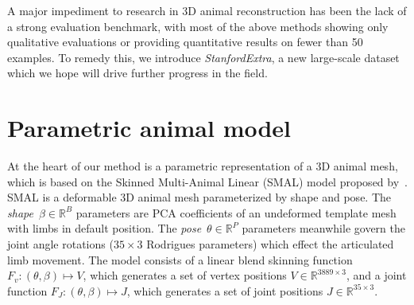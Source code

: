 
A major impediment to research in 3D animal reconstruction has been the lack of a strong evaluation benchmark, with most of the above methods showing only qualitative evaluations or providing quantitative results on fewer than 50 examples. To remedy this, we introduce \emph{StanfordExtra}, a new large-scale dataset which we hope will drive further progress in the field. 



\section{Parametric animal model}

\def\R#1{{\mathbb{R}^{#1}}}
\def\RR#1#2{{\mathbb{R}^{#1 \times #2}}}
\def\posn{\phi}
\def\pose{\theta}
\def\npose{P}
\def\shape{\beta}
\def\scale{\kappa}
\def\trans{t}
\def\betacov{{\Sigma_{\beta}}}
\def\posecov{{\Sigma_{\pose}}}
\def\posemean{{\mu_{\pose}}}
\def\betamean{{\mu_{\beta}}}
\def\nimages{N}
\def\nshape{B}
\def\verts{\nu}
\def\nverts{V}
\def\jointselect{\mathtt{K}}
\def\njoints{J}
\def\f{f}

At the heart of our method is a parametric representation of a 3D animal mesh, which is based on the Skinned Multi-Animal Linear (SMAL) model proposed by~\cite{zuffi2017menagerie}. SMAL is a deformable 3D animal mesh parameterized by shape and pose. The \emph{shape}~$\shape \in \R\nshape$ parameters are PCA coefficients of an undeformed template mesh with limbs in default position. The \emph{pose}~$\pose \in \R\npose$ parameters meanwhile govern the joint angle rotations ($35 \times 3$ Rodrigues parameters) which effect the articulated limb movement. The model consists of a linear blend skinning function $F_{v}: (\pose, \shape) \mapsto V$, which generates a set of vertex positions $V \in \RR{3889}{3}$, and a joint function $F_{J}: (\pose, \shape) \mapsto J$, which generates a set of joint positions $J \in \RR{35}{3}$.

